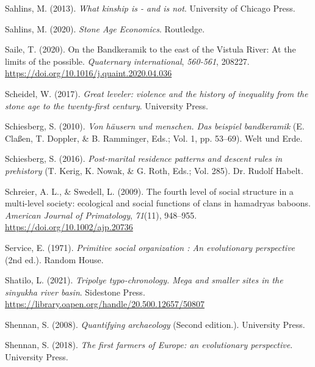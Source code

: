 \documentclass[
  12pt,
]{book}
\newlength{\cslhangindent}
\newlength{\cslentryspacingunit} %
\newenvironment{CSLReferences}[2] %
 {%
  \setlength{\parindent}{0pt}
  \ifodd #1
  \let\oldpar\par
  \def\par{\hangindent=\cslhangindent\oldpar}
  \fi
  \setlength{\parskip}{#2\cslentryspacingunit}
 }%
 {}
\begin{document}
\begin{CSLReferences}{1}{0}
\leavevmode{}%
Sahlins, M. (2013). \emph{What kinship is - and is not}. University of Chicago Press.

\leavevmode{}%
Sahlins, M. (2020). \emph{Stone Age Economics}. Routledge.

\leavevmode{}%
Saile, T. (2020). On the Bandkeramik to the east of the Vistula River: At the limits of the possible. \emph{Quaternary international}, \emph{560-561}, 208227. \url{https://doi.org/10.1016/j.quaint.2020.04.036}

\leavevmode{}%
Scheidel, W. (2017). \emph{Great leveler: violence and the history of inequality from the stone age to the twenty-first century}. University Press.

\leavevmode{}%
Schiesberg, S. (2010). \emph{Von häusern und menschen. Das beispiel bandkeramik} (E. Claßen, T. Doppler, \& B. Ramminger, Eds.; Vol. 1, pp. 53--69). Welt und Erde.

\leavevmode{}%
Schiesberg, S. (2016). \emph{Post-marital residence patterns and descent rules in prehistory} (T. Kerig, K. Nowak, \& G. Roth, Eds.; Vol. 285). Dr. Rudolf Habelt.

\leavevmode{}%
Schreier, A. L., \& Swedell, L. (2009). The fourth level of social structure in a multi-level society: ecological and social functions of clans in hamadryas baboons. \emph{American Journal of Primatology}, \emph{71}(11), 948--955. \url{https://doi.org/10.1002/ajp.20736}

\leavevmode{}%
Service, E. (1971). \emph{Primitive social organization : An evolutionary perspective} (2nd ed.). Random House.

\leavevmode{}%
Shatilo, L. (2021). \emph{Tripolye typo-chronology. Mega and smaller sites in the sinyukha river basin}. Sidestone Press. \url{https://library.oapen.org/handle/20.500.12657/50807}

\leavevmode{}%
Shennan, S. (2008). \emph{Quantifying archaeology} (Second edition.). University Press.

\leavevmode{}%
Shennan, S. (2018). \emph{The first farmers of Europe: an evolutionary perspective}. University Press.


\end{CSLReferences}
\end{document}
